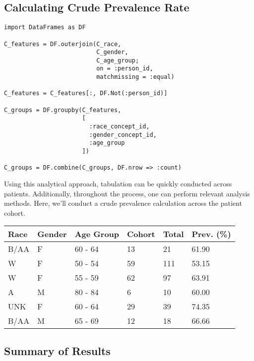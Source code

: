\documentclass{juliacon}
\begin{document}
\subsection{Calculating Crude Prevalence Rate}

\begin{verbatim}
import DataFrames as DF

C_features = DF.outerjoin(C_race,
                          C_gender,
                          C_age_group;
                          on = :person_id, 
                          matchmissing = :equal)

C_features = C_features[:, DF.Not(:person_id)]

C_groups = DF.groupby(C_features, 
                      [
                        :race_concept_id, 
                        :gender_concept_id, 
                        :age_group
                      ])

C_groups = DF.combine(C_groups, DF.nrow => :count)
\end{verbatim}

Using this analytical approach, tabulation can be quickly conducted across patients.
Additionally, throughout the process, one can perform relevant analysis methods.
Here, we'll conduct a crude prevalence calculation across the patient cohort.

\begin{table}[!ht]
    \centering
    \begin{tabular}{|l|l|l|l|l|l|}
    \hline
        Race & Gender & Age Group & Cohort & Total & Prev. (\%) \\ \hline
        B/AA & F & 60 - 64 & 13 & 21 & 61.90 \\ \hline
        W & F & 50 - 54 & 59 & 111 & 53.15 \\ \hline
        W & F & 55 - 59 & 62 & 97 & 63.91 \\ \hline
        A & M & 80 - 84 & 6 & 10 & 60.00 \\ \hline
        UNK & F & 60 - 64 & 29 & 39 & 74.35 \\ \hline
        B/AA & M & 65 - 69 & 12 & 18 & 66.66 \\ \hline
    \end{tabular}
\end{table}

\subsection{Summary of Results}
\end{document}
